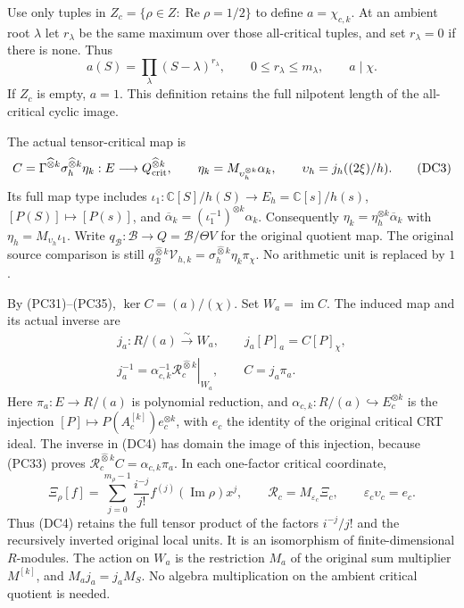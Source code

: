 Use only tuples in $Z_c=\{\rho\in Z:\operatorname{Re}\rho=1/2\}$ to
define $a=\chi_{c,k}$.  At an ambient root $\lambda$ let $r_\lambda$
be the same maximum over those all-critical tuples, and set
$r_\lambda=0$ if there is none.  Thus
\[
 a(S)=\prod_\lambda(S-\lambda)^{r_\lambda},\qquad
 0\le r_\lambda\le m_\lambda,\qquad a\mid\chi.
 \tag{DC2}
\]
If $Z_c$ is empty, $a=1$.  This definition retains the full nilpotent
length of the all-critical cyclic image.

The actual tensor-critical map is
\[
 C=\Gamma^{\widehat\otimes k}\sigma_h^{\widehat\otimes k}\eta_k:
 E\longrightarrow Q_{\rm crit}^{\widehat\otimes k},\qquad
 \eta_k=M_{\upsilon_h^{\otimes k}}\alpha_k,\qquad
 \upsilon_h=j_h((2\xi)/h).
 \tag{DC3}
\]
Its full map type includes
$\iota_1:\mathbb C[S]/h(S)\to E_h=\mathbb C[s]/h(s)$,
$[P(S)]\mapsto[P(s)]$, and
$\overline\alpha_k=(\iota_1^{-1})^{\otimes k}\alpha_k$.
Consequently $\eta_k=\eta_h^{\otimes k}\overline\alpha_k$ with
$\eta_h=M_{\upsilon_h}\iota_1$.
Write $q_{\mathscr B}:\mathscr B\to Q=\mathscr B/\Theta V$
for the original quotient map.  The original source comparison is still
$q_{\mathscr B}^{\widehat\otimes k}\mathcal V_{h,k}
=\sigma_h^{\widehat\otimes k}\eta_k\pi_\chi$.
No arithmetic unit is replaced by $1$.

By (PC31)--(PC35), $\ker C=(a)/(\chi)$.  Set $W_a=\operatorname{im}C$.
The induced map and its actual inverse are
\[
 \begin{gathered}
 j_a:R/(a)\xrightarrow{\sim}W_a,\qquad
 j_a[P]_a=C[P]_\chi,\\
 j_a^{-1}
 =\alpha_{c,k}^{-1}
   \left.\mathcal R_c^{\widehat\otimes k}\right|_{W_a},
 \qquad C=j_a\pi_a .
 \end{gathered}
 \tag{DC4}
\]
Here $\pi_a:E\to R/(a)$ is polynomial reduction, and
$\alpha_{c,k}:R/(a)\hookrightarrow E_c^{\otimes k}$ is the injection
$[P]\mapsto P(A_c^{[k]})e_c^{\otimes k}$, with $e_c$ the identity of
the original critical CRT ideal.  The inverse in (DC4) has domain the
image of this injection, because (PC33) proves
$\mathcal R_c^{\widehat\otimes k}C=\alpha_{c,k}\pi_a$.
In each one-factor critical coordinate,
\[
 \Xi_\rho[f]=
 \sum_{j=0}^{m_\rho-1}\frac{i^{-j}}{j!}f^{(j)}(\operatorname{Im}\rho)x^j,
 \qquad
 \mathcal R_c=M_{\varepsilon_c}\Xi_c,\qquad
 \varepsilon_c\upsilon_c=e_c .
 \tag{DC5}
\]
Thus (DC4) retains the full tensor product of the factors
$i^{-j}/j!$ and the recursively inverted original local units.
It is an isomorphism of finite-dimensional $R$-modules.  The action on
$W_a$ is the restriction $M_a$ of the original sum multiplier
$M^{[k]}$, and $M_a j_a=j_a M_S$.  No algebra multiplication on the
ambient critical quotient is needed.

